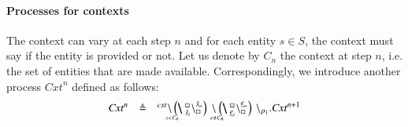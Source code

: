 \paragraph{Processes for contexts}
The context can vary at each step $n$ and for each entity $s \in S$, the context must say if the entity is provided or not. Let us denote by $C_n$ the context at step $n$, i.e. the set of entities that are made available. Correspondingly, we introduce another process $\mathit{Cxt}^n$ defined as follows:
\[
\begin{array}{lcl}
\mathit{Cxt}^n &\defeq &
^{cxt} \backslash  \blockchain{\hat{s}_i}{\hat{s}_o}{s\!\in \!C_n}  \link{}{} \blockchain{\underline{e}_i}{\underline{e}_o}{e \!\not\in \! C_n}   \backslash_{p_1}. \mathit{Cxt}^{n+1}
\end{array}
\]





